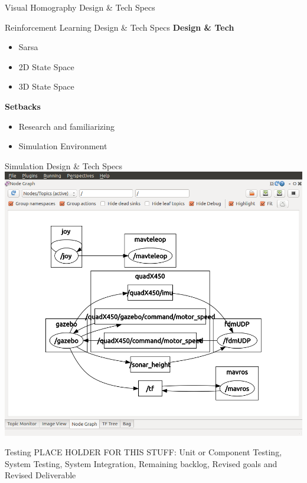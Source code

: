 \documentclass[11pt]{beamer}
\begin{document}
\begin{frame}{Visual Homography Design \& Tech Specs}

\end{frame}

\begin{frame}{Reinforcement Learning Design \& Tech Specs}
\large{\textbf{Design \& Tech}}
	\begin{itemize}
		\item Sarsa
		\item 2D State Space
		\item 3D State Space
	\end{itemize}
\large{\textbf{Setbacks}}
	\begin{itemize}
		\item Research and familiarizing
		\item Simulation Environment
	\end{itemize}
\end{frame}

\begin{frame}{Simulation Design \& Tech Specs}
\includegraphics[width=1\textwidth]{images/ardusitl.png}
\end{frame}




\begin{frame}{Testing}
PLACE HOLDER FOR THIS STUFF:
Unit or Component Testing,  System Testing,  System Integration,  Remaining backlog,  Revised goals
and Revised Deliverable
\end{frame}
\end{document}
